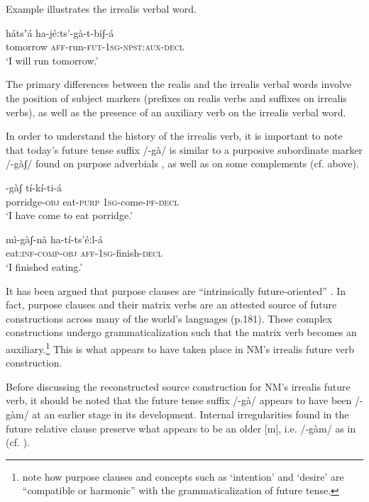 \documentclass[output=paper]{langsci/langscibook}
\begin{document}
Example  illustrates the irrealis verbal word. 


\ea\label{ex:mahland:74}
\gll hátsʼá    ha-jéːts'-gà-t-bíʃ-á     \\
tomorrow  \textsc{aff}{}-run-\textsc{fut-1sg-npst:aux-decl} \\
\glt `I will run tomorrow.'
\z

The primary differences between the realis and the irrealis verbal words involve the position of subject markers (prefixes on realis verbs and suffixes on irrealis verbs), as well as the presence of an auxiliary verb on the irrealis verbal word. 

In order to understand the history of the irrealis verb, it is important to note that today's future tense suffix /-gà/ is similar to a purposive subordinate marker /-gàʃ/ found on purpose adverbials , as well as on some complements  (cf.  above). 

\ea\label{ex:mahland:75}
\gll [kàːl-là     mí]-gàʃ  tí-kí-ti-á\\
  porridge-\textsc{obj}    eat-\textsc{purp}  \textsc{1sg}{}-come-\textsc{pf-decl} \\
  \glt `I have come to eat porridge.'
\z

\ea\label{ex:mahland:76}
\gll mì-gàʃ-nà             ha-tí-ts'éːl-{\downstep}á \\
  eat:\textsc{inf-comp-obj}  \textsc{aff-1sg-}finish-\textsc{decl}   \\
  \glt `I finished eating.'
\z

It has been argued that purpose clauses are “intrinsically future-oriented” \citep[43]{Schmidtke-Bode2009}. In fact, purpose clauses and their matrix verbs are an attested source of future constructions across many of the world's languages (p.181). These complex constructions undergo grammaticalization such that the matrix verb becomes an auxiliary.\footnote{\citet[263-75]{BybeeEtAl1994} note how purpose clauses and concepts such as `intention' and `desire' are “compatible or harmonic” with the grammaticalization of future tense.} This is what appears to have taken place in NM's irrealis future verb construction. 

Before discussing the reconstructed source construction for NM's irrealis future verb, it should be noted that the future tense suffix /-gà/ appears to have been /-gàm/ at an earlier stage in its development. Internal irregularities found in the future relative clause preserve what appears to be an older [m], i.e. /-gàm/ as in  (cf. \citealt[10]{Ahland2014b}).
\end{document}
